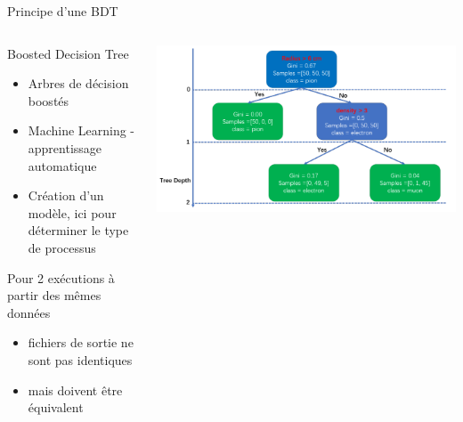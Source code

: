 \documentclass[9pt]{beamer}
\begin{document}
\begin{frame}{Principe d'une BDT}

    \begin{columns}
    
        \begin{column}{0.5\textwidth}
            \begin{block}{Boosted Decision Tree}
                \begin{itemize}
                    \item Arbres de décision boostés
                    \item Machine Learning - apprentissage automatique
                    \item Création d'un modèle, ici pour déterminer le type de processus 
                    
                \end{itemize}
            \end{block}
            \begin{alertblock}{Pour 2 exécutions à partir des mêmes données}
                \begin{itemize}
                    \item fichiers de sortie ne sont pas identiques 
                    \item mais doivent être équivalent
                \end{itemize}
            \end{alertblock}
        \end{column}
        
        \begin{column}{0.5\textwidth}
            \includegraphics[width=\textwidth]{../img/ExampleBDT.png}
        \end{column}
        
    \end{columns}

\end{frame}
\end{document}
